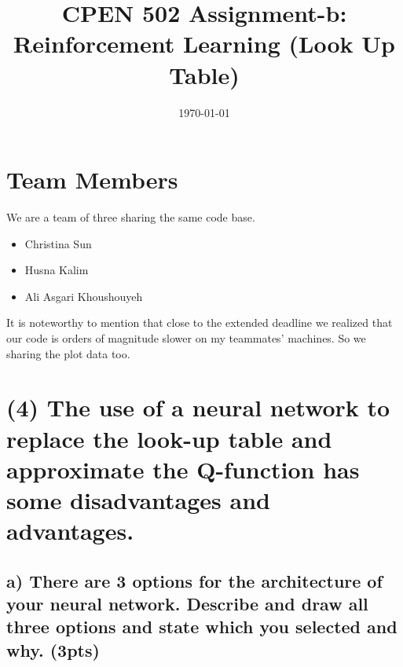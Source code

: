 \documentclass[a4paper,12pt]{article}
\title{CPEN 502 Assignment-b: Reinforcement Learning (Look Up Table)}
\author{\authorName}
\date{\today}
\begin{document}
\maketitle

\section*{Team Members}
We are a team of three sharing the same code base. 
\begin{itemize}
\item Christina Sun
\item Husna Kalim
\item Ali Asgari Khoushouyeh
\end{itemize}


It is noteworthy to mention that close to the extended deadline we realized that our code is orders of magnitude slower on my teammates' machines. So we sharing the plot data too. 
\pagebreak
\section*{(4) The use of a neural network to replace the look-up table and approximate the Q-function has some disadvantages and advantages.}
\subsection*{a) There are 3 options for the architecture of your neural network. Describe and draw all three options and state which you selected and why. (3pts)}
\end{document}
